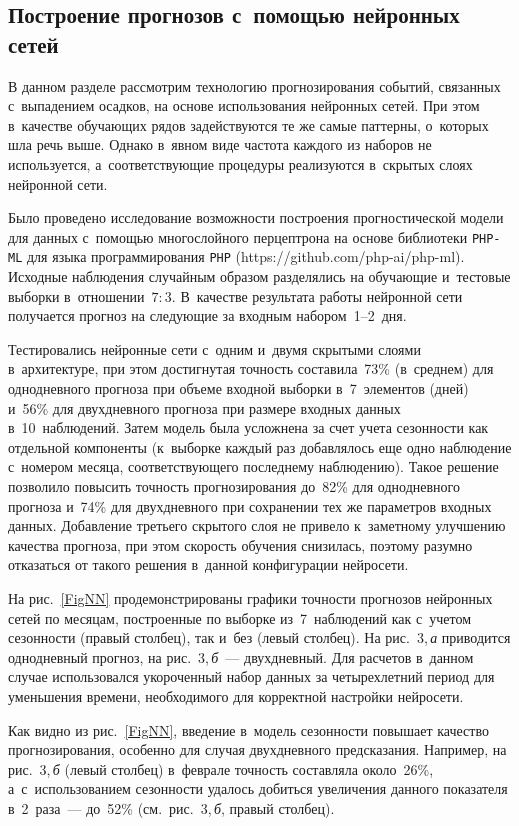 \begin{multicols}{2}
\section{Построение прогнозов с~помощью нейронных сетей}

В данном разделе рассмотрим технологию прогнозирования событий, связанных 
с~выпадением осадков, на основе использования нейронных сетей. При этом 
в~качестве обучающих рядов задействуются те же самые паттерны, о~которых шла
речь выше. Однако в~явном виде частота каждого из наборов не используется, 
а~соответствующие процедуры реализуются в~скрытых слоях нейронной сети.

Было проведено исследование возможности построения прогностической модели
для данных с~помощью многослойного перцептрона на основе биб\-лио\-те\-ки
\verb"PHP-ML" для языка программирования \verb"PHP"
({\sf https://github.com/php-ai/php-ml}). Исходные наблюдения случайным образом
разделялись на обуча\-ющие и~тестовые выборки в~отношении~$7:3$. В~качестве
результата работы нейронной сети получается прогноз на следующие за входным
набором~1--2~дня.

Тестировались нейронные сети с~одним и~двумя скрытыми слоями в~архитектуре,
при этом достигнутая точность составила~73\% (в~среднем) для однодневного
прогноза при объеме входной выборки в~7~элементов (дней) и~56\% для
двухдневного прогноза при размере входных данных в~10~наблюдений. Затем
модель была усложнена за счет учета сезонности как отдельной компоненты 
(к~выборке каждый раз добавлялось еще одно наблюдение с~номером месяца,
соответствующего последнему наблюдению). Такое решение позволило повысить
точность прогнозирования до~82\% для однодневного прогноза и~74\% для
двухдневного при сохранении тех же параметров входных данных. Добавление
третьего скрытого слоя не привело к~заметному улучшению  качества прогноза,
при этом скорость обучения снизилась, поэтому разумно отказаться от такого
решения в~данной конфигурации нейросети.

На рис.~\ref{FigNN} продемонстрированы графики точ\-ности прогнозов 
нейронных сетей по месяцам, построенные по выборке из~7~наблюдений 
как с~учетом сезонности (правый столбец), так и~без (левый столбец). 
На рис.~3,\,\textit{а} приводится однодневный прогноз, на рис.~3,\,\textit{б}~--- 
двухдневный. Для расчетов в~данном случае использовался укороченный набор 
данных за четырехлетний период для уменьшения времени, необходимого 
для корректной настройки нейросети.


Как видно из рис.~\ref{FigNN}, введение в~модель се\-зон\-ности 
повышает качество прогнозирования, особенно для случая двухдневного 
предсказания. Например, на рис.~3,\,\textit{б} (левый столбец)
в~феврале \mbox{точ\-ность} 
со\-став\-ля\-ла около~26\%, а~с~использованием сезонности удалось добиться 
увеличения данного показателя в~2~раза~--- до~52\% (см.\ рис.~3,\,\textit{б},
правый столбец).


\end{multicols}

